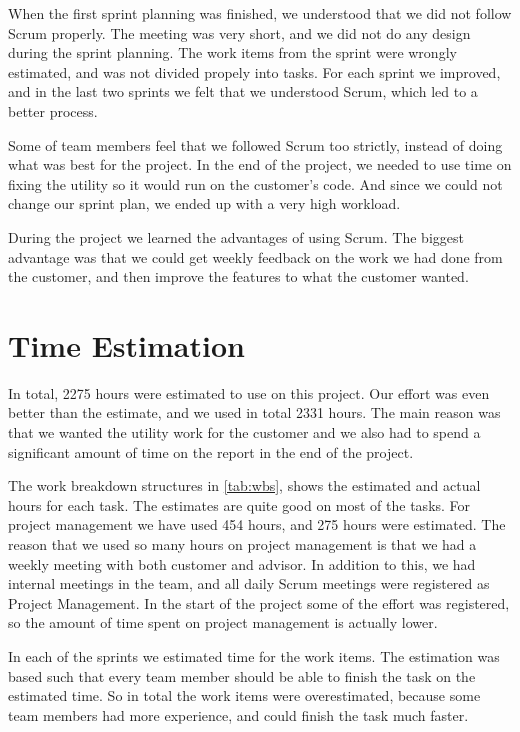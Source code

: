 When the first sprint planning was finished, we understood that we did not 
follow Scrum properly. The meeting was very short, and we did not do any 
design during the sprint planning. The work items from the sprint were wrongly
estimated, and was not divided propely into tasks. For each sprint we 
improved, and in the last two sprints we felt that we understood Scrum,
which led to a better process.

Some of team members feel that we followed Scrum too strictly, instead of doing 
what was best for the project. In the end of the project, we needed to use 
time on fixing the utility so it would run on the customer's code. And since we 
could not change our sprint plan, we ended up with a very high workload.

During the project we learned the advantages of using Scrum. The biggest advantage was that we could 
get weekly feedback on the work we had done from the customer, and then improve the features 
to what the customer wanted.

\section{Time Estimation}
In total, 2275 hours were estimated to use on this project. Our effort was
even better than the estimate, and we used in total 2331 hours. The main reason
was that we wanted the utility work for the customer and we also had to spend a significant
amount of time on the report in the end of the project. 

The work breakdown structures in \autoref{tab:wbs}, shows the estimated and 
actual hours for each task. The estimates are quite good on most of the tasks. 
For project management we have used 454 hours, and 275 hours were estimated. 
The reason that we used so many hours on project management is that we had 
a weekly meeting with both customer and advisor. In addition to this, we had 
internal meetings in the team, and all daily Scrum meetings were registered as 
Project Management. In the start of the project some of the effort was 
registered, so the amount of time spent on project management is actually lower.

In each of the sprints we estimated time for the work items. The estimation 
was based such that every team member should be able to finish the task on the 
estimated time. So in total the work items were overestimated, because some 
team members had more experience, and could finish the task much faster.

